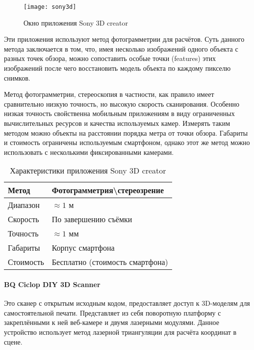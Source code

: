         \begin{figure}[H]
            \centering
            \texttt{[image: sony3d]}\label{pic:sony3d}
            \caption{Окно приложения Sony 3D creator}
        \end{figure}

        Эти приложения используют метод фотограмметрии для расчётов. Суть данного метода заключается в том, что, имея несколько изображений одного объекта с разных точек обзора, можно сопоставить особые точки (features) этих изображений после чего восстановить модель объекта по каждому пикселю снимков\cite{Guzhov}.

        Метод фотограмметрии, стереоскопия в частности, как правило имеет сравнительно низкую точность, но высокую скорость сканирования. Особенно низкая точность свойственна мобильным приложениям в виду ограниченных вычислительных ресурсов и качества используемых камер. Измерять таким методом можно объекты на расстоянии порядка метра от точки обзора. Габариты и стоимость ограничены используемым смартфоном, однако этот же метод можно использовать с несколькими фиксированными камерами.

        \begin{table}[H]
            \centering
            \caption{Характеристики приложения Sony 3D creator}\label{table:sony3d}
            \begin{tabular}{|l|l|}\hline
                Метод&Фотограмметрия\textbackslash{}стереозрение\\ \hline
                Диапазон&$\approx 1$ м\\ \hline
                Скорость&По завершению съёмки\\ \hline
                Точность&$\approx 1$ мм\\ \hline
                Габариты&Корпус смартфона\\ \hline
                Стоимость&Бесплатно (стоимость смартфона)\\ \hline
            \end{tabular}
        \end{table}

    \paragraph{BQ Ciclop DIY 3D Scanner}
        Это сканер с открытым исходным кодом, предоставляет доступ к 3D-моделям для самостоятельной печати\cite{ciclop}. Представляет из себя поворотную платформу с закреплёнными к ней веб-камере и двумя лазерными модулями. Данное устройство использует метод лазерной триангуляции для расчёта координат в сцене.

